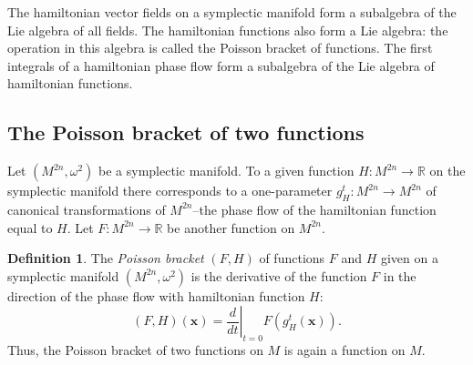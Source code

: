 \documentclass[leqno]{report}
\numberwithin{equation}{section}
\theoremstyle{plain}
\theoremstyle{definition}
\newtheorem*{defn*}{Definition}
\theoremstyle{remark}
\theoremstyle{smallcap}
\numberwithin{prob}{section}
\begin{document}
The hamiltonian vector fields on a symplectic manifold
form a subalgebra of the Lie algebra of all fields.
%
The hamiltonian functions also form a Lie algebra:
the operation in this algebra is called the Poisson bracket
of functions.
%
The first integrals of a hamiltonian phase flow form
a subalgebra of the Lie algebra of hamiltonian functions.


\begin{figure}[h]
  \centering
\end{figure}

\subsection{The Poisson bracket of two functions}

Let $(M^{2n}, \omega^2)$ be a symplectic manifold.
To a given function $H: M^{2n} \to \mathbb R$
on the symplectic manifold
there corresponds to a one-parameter
$g_H^t: M^{2n} \to M^{2n}$
of canonical transformations of $M^{2n}$--the
phase flow of the hamiltonian function equal to $H$.
%
Let $F: M^{2n} \to \mathbb R$
be another function on $M^{2n}$.

\begin{defn*}
  The \emph{Poisson bracket} $(F, H)$ of functions $F$ and $H$
  given on a symplectic manifold $(M^{2n}, \omega^2)$
  is the derivative of the function $F$ in the direction of
  the phase flow with hamiltonian function $H$:
  $$
  (F, H)(\mathbf x)
  =
  \left. \frac{ d }{ dt } \right|_{t = 0}
  F( g_H^t( \mathbf x ) ).
  $$
  Thus, the Poisson bracket of two functions on $M$ is again
  a function on $M$.
\end{defn*}
\end{document}
